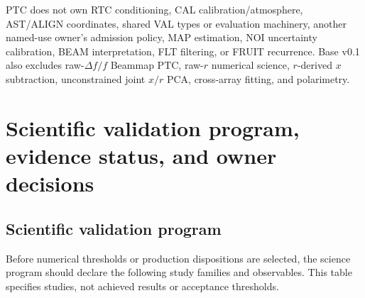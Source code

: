 \documentclass[11pt]{article}
\begin{document}
PTC does not own RTC conditioning, CAL calibration/atmosphere, AST/ALIGN
coordinates, shared VAL types or evaluation machinery, another named-use
owner's admission policy, MAP estimation, NOI uncertainty
calibration, BEAM interpretation, FLT filtering, or FRUIT recurrence. Base
v0.1 also excludes raw-$\Delta f/f$ Beammap PTC, raw-$r$ numerical science,
$r$-derived $x$ subtraction, unconstrained joint $x/r$ PCA, cross-array
fitting, and polarimetry.

\section{Scientific validation program, evidence status, and owner decisions}
\label{sec:science-status}

\subsection{Scientific validation program}

Before numerical thresholds or production dispositions are selected, the
science program should declare the following study families and observables.
This table specifies studies, not achieved results or acceptance thresholds.
\end{document}

